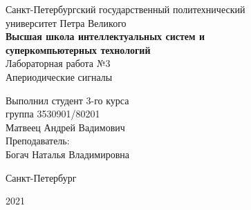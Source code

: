 \documentclass[a4paper]{article}
\begin{document}
    \begin{center}
        \begin{center}
        \hfill \break
        \normalsize{Санкт-Петербургский государственный политехнический}\\
        \normalsize{университет Петра Великого}\\
        \hfill \break
        \normalsize{\textbf{Высшая школа интеллектуальных систем и}}\\ 
        \normalsize{\textbf{суперкомпьютерных технологий}}\\ 
        \hfill \break
        \hfill \break
        \hfill \break
        \normalsize{Лабораторная работа №3}\\
        \hfill \break
        \hfill \break
        \normalsize{\LARGE Апериодические сигналы}\\
        \end{center}
        \hfill \break
        \hfill \break
        \hfill \break
        \hfill \break
        \hfill \break
        \hfill \break
        \hfill \break
        \hfill \break
        \hfill \break
        \hfill \break
        \begin{flushright}
            \normalsize{Выполнил студент 3-го курса}\\
            \normalsize{группа 3530901/80201}\\
            \normalsize{Матвеец Андрей Вадимович}\\
            \hfill \break
            \normalsize{Преподаватель:}\\
            \normalsize{Богач Наталья Владимировна}\\
        \end{flushright}
        \hfill \break
        \hfill \break
        \hfill \break
        \hfill \break
        \begin{center} Санкт-Петербург\end{center}
        \begin{center}2021\end{center} 
        \thispagestyle{empty}
    \end{center}
    
    \newpage
        \tableofcontents
    
    \newpage
         \listoffigures
    
    \newpage
         \lstlistoflistings   
     
\end{document}
